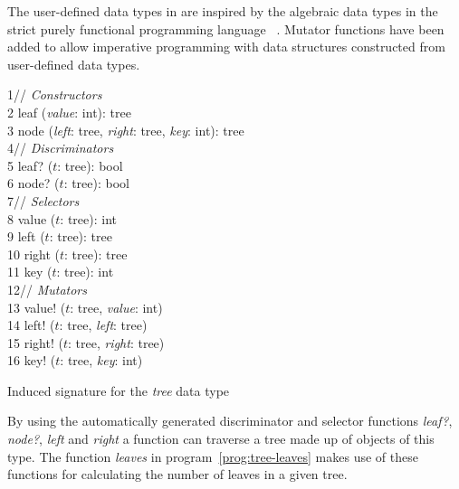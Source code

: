 The user-defined data types in \turtle{} are inspired by the algebraic
data types in the strict purely functional programming language
\opal{}~\cite{Pepper.Opal}.  Mutator functions have been added to
allow imperative programming with data structures constructed from
user-defined data types.

\begin{Program}
\begin{ttlprog}
1\>// {\em Constructors}\\
2\>\ttlFun{} leaf ({\em value}: int): tree\\
3\>\ttlFun{} node ({\em left}: tree, {\em right}: tree, {\em key}: int): tree\\
4\>// {\em Discriminators}\\
5\>\ttlFun{} leaf? ($t$: tree): bool\\
6\>\ttlFun{} node? ($t$: tree): bool\\
7\>// {\em Selectors}\\
8\>\ttlFun{} value ($t$: tree): int\\
9\>\ttlFun{} left ($t$: tree): tree\\
10\>\ttlFun{} right ($t$: tree): tree\\
11\>\ttlFun{} key ($t$: tree): int\\
12\>// {\em Mutators}\\
13\>\ttlFun{} value{!} ($t$: tree, {\em value}: int)\\
14\>\ttlFun{} left{!} ($t$: tree, {\em left}: tree)\\
15\>\ttlFun{} right{!} ($t$: tree, {\em right}: tree)\\
16\>\ttlFun{} key{!} ($t$: tree, {\em key}: int)
\end{ttlprog}
\caption{Induced signature for the {\em tree} data type}
\label{prog:induced-signature}
\end{Program}

By using the automatically generated discriminator and selector
functions {\em leaf?}, {\em node?}, {\em left} and {\em right} a
function can traverse a tree made up of objects of this type.  The
function {\em leaves} in program~\ref{prog:tree-leaves} makes use of these
functions for calculating the number of leaves in a given tree.

